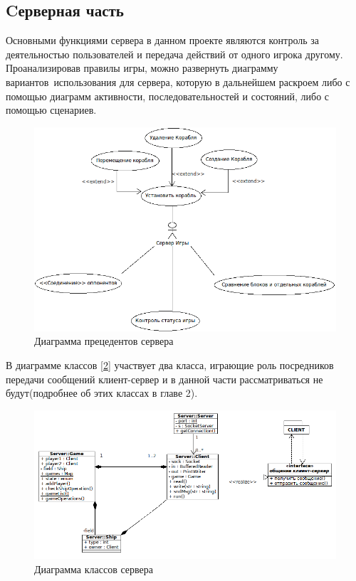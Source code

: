 ﻿\subsection{Cерверная часть}

Основными функциями сервера в данном проекте являются контроль за деятельностью пользователей и передача действий от одного игрока другому. Проанализировав правилы игры, можно развернуть диаграмму вариантов~использования для сервера, которую в дальнейшем раскроем либо с помощью диаграмм активности, последовательностей и состояний, либо с помощью сценариев.
  
\begin{figure}[htp]
\centering
\includegraphics[width=15cm]{images/useserver.png}
\caption{Диаграмма прецедентов сервера}
\label{fig14}
\end{figure}

В диаграмме классов [\ref{fig15}] участвует два класса, играющие роль посредников передачи сообщений клиент-сервер и в данной части рассматриваться не будут(подробнее об этих классах в главе 2). 

\begin{figure}[htp]
\centering
\includegraphics[width=18cm]{images/class_server.png}
\caption{Диаграмма классов сервера}
\label{fig15}
\end{figure}

